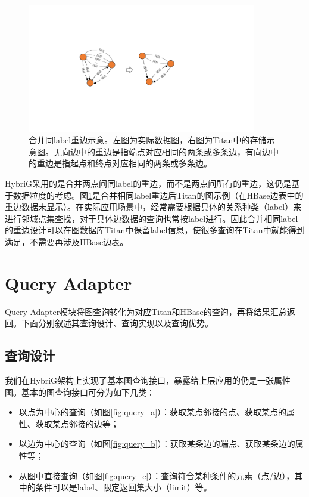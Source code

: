 \begin{figure}[htbp]
\centering
\includegraphics[width=100mm]{fig/merge_edges.pdf}
\caption[合并同label重边示意图]{合并同label重边示意。左图为实际数据图，右图为Titan中的存储示意图。无向边中的重边是指端点对应相同的两条或多条边，有向边中的重边是指起点和终点对应相同的两条或多条边。}
\label{fig:merge_edges}
\end{figure}

HybriG采用的是合并两点间同label的重边，而不是两点间所有的重边，这仍是基于数据粒度的考虑。图\ref{fig:merge_edges}是合并相同label重边后Titan的图示例（在HBase边表中的重边数据未显示）。在实际应用场景中，经常需要根据具体的关系种类（label）来进行邻域点集查找，对于具体边数据的查询也常按label进行。因此合并相同label的重边设计可以在图数据库Titan中保留label信息，使很多查询在Titan中就能得到满足，不需要再涉及HBase边表。


\section{Query Adapter}
Query Adapter模块将图查询转化为对应Titan和HBase的查询，再将结果汇总返回。下面分别叙述其查询设计、查询实现以及查询优势。
\subsection{查询设计}
我们在HybriG架构上实现了基本图查询接口，暴露给上层应用的仍是一张属性图。基本的图查询接口可分为如下几类：
\begin{itemize}
	\item 以点为中心的查询（如图\ref{fig:query_a}）：获取某点邻接的点、获取某点的属性、获取某点邻接的边等；
	\item 以边为中心的查询（如图\ref{fig:query_b}）：获取某条边的端点、获取某条边的属性等；
	\item 从图中直接查询（如图\ref{fig:query_c}）：查询符合某种条件的元素（点/边），其中的条件可以是label、限定返回集大小（limit）等。
\end{itemize}

